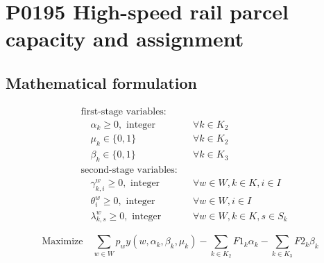 \documentclass[10pt]{article}
\begin{document}
\section*{P0195 High-speed rail parcel capacity and assignment}
\subsection*{Mathematical formulation}
\begin{align*}
&\text{first-stage variables:} \\
&\quad \alpha_k \geq 0, \text{ integer} && \forall k \in K_2 \\
&\quad \mu_k \in \{0, 1\} && \forall k \in K_2 \\
&\quad \beta_k \in \{0, 1\} && \forall k \in K_3 \\
&\text{second-stage variables:} \\
&\quad \gamma^w_{k,i} \geq 0, \text{ integer} && \forall w \in W, k \in K, i \in I \\
&\quad \theta^w_i \geq 0, \text{ integer} && \forall w \in W, i \in I \\
&\quad \lambda^w_{k,s} \geq 0, \text{ integer} && \forall w \in W, k \in K, s \in S_k
\end{align*}

\begin{equation}\tag{1}
\text{Maximize} \quad \sum_{w \in W} p_w y(w, \alpha_k, \beta_k, \mu_k) - \sum_{k \in K_2} F1_k \alpha_k - \sum_{k \in K_3} F2_k \beta_k
\end{equation}
\end{document}
